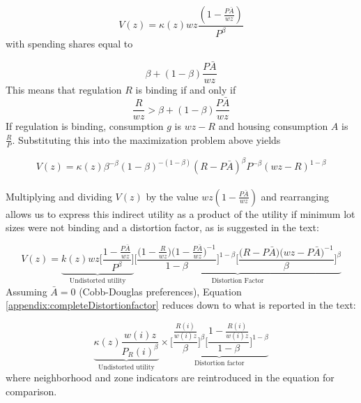 \documentclass[12pt]{article}
\begin{document}
	\begin{equation*}
		V(z) = \kappa(z)wz\frac{(1 - \frac{P \bar{A}}{wz})}{P^{\beta}} 
	\end{equation*}
	with spending shares equal to 
	
	\begin{equation*}
		\beta + (1 - \beta)\frac{P \bar{A}}{wz}
	\end{equation*}
	This means that regulation $R$ is binding if and only if 
	\begin{equation*}
		\frac{R}{wz} > \beta + (1-\beta)\frac{P\bar{A}}{wz}
	\end{equation*} 
	If regulation is binding, consumption $g$ is $wz - R$ and housing consumption $A$ is $\frac{R}{P}$. Substituting this into the maximization problem above yields
	
	\begin{equation*}
		V(z) = \kappa(z)\beta^{-\beta}(1-\beta)^{-(1-\beta)}(R - P\bar{A})^{\beta}P^{-\beta}(wz - R)^{1-\beta}
	\end{equation*}
	
	
	
	\paragraph*{}
	Multiplying and dividing $V(z)$ by the value $wz(1 - \frac{P\bar{A}}{wz})$ and rearranging allows us to express this indirect utility as a product of the utility if minimum lot sizes were not binding and a distortion factor, as is suggested in the text:
	
	\begin{equation}\label{appendix:completeDistortionfactor}
		V(z) = \underbrace{k(z)wz\bigg[\frac{1-\frac{P\bar{A}}{wz}}{P^{\beta}}\bigg]}_{\text{Undistorted utility}} \underbrace{\bigg[\frac{\big(1 - \frac{R}{wz}\big)\big(1 - \frac{P\bar{A}}{wz}\big)^{-1}}{1-\beta}\bigg]^{1-\beta}\bigg[\frac{\big(R - P\bar{A}\big)\big(wz - P\bar{A}\big)^{-1}}{\beta}\bigg]^{\beta}}_{\text{Distortion Factor}}
	\end{equation}
	Assuming $\bar{A} = 0$ (Cobb-Douglas preferences), Equation \eqref{appendix:completeDistortionfactor} reduces down to what is reported in the text: 
	
	\begin{equation*}
	\underbrace{\kappa(z)\frac{w(i)z}{P_{R}(i)^{\beta}}}_{\text{Undistorted utility}}  \times \underbrace{\biggl[\frac{\frac{R(i)}{w(i)z}}{\beta}\biggl]^{\beta}\biggl[\frac{1- \frac{R(i)}{w(i)z}}{1-\beta}\biggl]^{1 - \beta}}_{\text{Distortion factor}}
	\end{equation*}
	where neighborhood and zone indicators are reintroduced in the equation for comparison.
	
\end{document}
